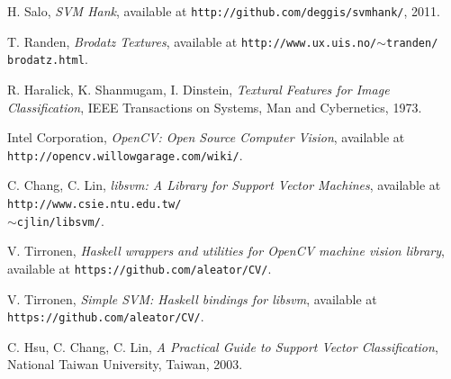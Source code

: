 \documentclass[11pt,twocolumn]{article}
\begin{document}
\begin{thebibliography}{55}

    H. Salo,
    \emph{SVM Hank},
    available at \texttt{http://github.com/deggis/svmhank/},
    2011.

    T. Randen,
    \emph{Brodatz Textures},
    available at \texttt{http://www.ux.uis.no/$\sim$tranden/\\brodatz.html}.

    R. Haralick, K. Shanmugam, I. Dinstein,
    \emph{Textural Features for Image Classification},
    IEEE Transactions on Systems, Man and Cybernetics,
    1973.

    Intel Corporation,
    \emph{OpenCV: Open Source Computer Vision},
    available at \texttt{http://opencv.willowgarage.com/wiki/}.

    C. Chang, C. Lin,
    \emph{libsvm: A Library for Support Vector Machines},
    available at \texttt{http://www.csie.ntu.edu.tw/\\ $\sim$cjlin/libsvm/}.

    V. Tirronen,
    \emph{Haskell wrappers and utilities for OpenCV machine vision library},
    available at \texttt{https://github.com/aleator/CV/}.

    V. Tirronen,
    \emph{Simple SVM: Haskell bindings for libsvm},
    available at \texttt{https://github.com/aleator/CV/}.

    C. Hsu, C. Chang, C. Lin,
    \emph{A Practical Guide to Support Vector Classification},
    National Taiwan University,
    Taiwan,
    2003.

\end{thebibliography}
\end{document}
